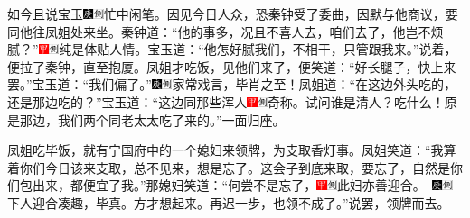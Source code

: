如今且说宝玉{\includegraphics[width=3mm]{../Images/00004}\includegraphics[width=3mm]{../Images/00011}\footnotesize \kaishu 忙中闲笔。}因见今日人众，恐秦钟受了委曲，因默与他商议，要同他往凤姐处来坐。秦钟道：``他的事多，况且不喜人去，咱们去了，他岂不烦腻？''{\includegraphics[width=3mm]{../Images/00002}\includegraphics[width=3mm]{../Images/00011}\footnotesize \kaishu 纯是体贴人情。}宝玉道：``他怎好腻我们，不相干，只管跟我来。''说着，便拉了秦钟，直至抱厦。凤姐才吃饭，见他们来了，便笑道：``好长腿子，快上来罢。''宝玉道：``我们偏了。''{\includegraphics[width=3mm]{../Images/00004}\includegraphics[width=3mm]{../Images/00011}\footnotesize \kaishu 家常戏言，毕肖之至！}凤姐道：``在这边外头吃的，还是那边吃的？''宝玉道：``这边同那些浑人{\includegraphics[width=3mm]{../Images/00002}\includegraphics[width=3mm]{../Images/00011}\footnotesize \kaishu 奇称。试问谁是清人？}吃什么！原是那边，我们两个同老太太吃了来的。''一面归座。

凤姐吃毕饭，就有宁国府中的一个媳妇来领牌，为支取香灯事。凤姐笑道：``我算着你们今日该来支取，总不见来，想是忘了。这会子到底来取，要忘了，自然是你们包出来，都便宜了我。''那媳妇笑道：``何尝不是忘了，{\includegraphics[width=3mm]{../Images/00002}\includegraphics[width=3mm]{../Images/00011}\footnotesize \kaishu 此妇亦善迎合。　\includegraphics[width=3mm]{../Images/00004}\includegraphics[width=3mm]{../Images/00011}\footnotesize \kaishu 下人迎合凑趣，毕真。}方才想起来。再迟一步，也领不成了。''说罢，领牌而去。

